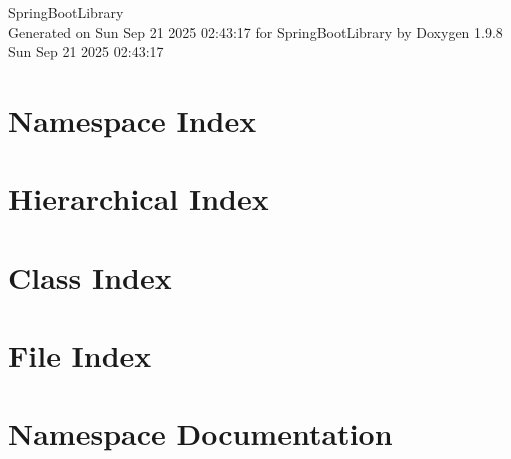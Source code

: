 \documentclass[twoside]{book}
\newcommand{\+}{\discretionary{\mbox{\scriptsize$\hookleftarrow$}}{}{}}
\newcommand{\clearemptydoublepage}{%
    \newpage{\pagestyle{empty}\cleardoublepage}%
  }
\begin{document}
  \raggedbottom
    \hypersetup{pageanchor=false,
                bookmarksnumbered=true,
                pdfencoding=unicode
               }
  \begin{titlepage}
  \vspace*{7cm}
  \begin{center}%
  {\Large Spring\+Boot\+Library}\\
  \vspace*{1cm}
  {\large Generated on Sun Sep 21 2025 02\+:43\+:17 for Spring\+Boot\+Library by Doxygen 1.9.8}\\
    \vspace*{0.5cm}
    {\small Sun Sep 21 2025 02:43:17}
  \end{center}
  \end{titlepage}
  \clearemptydoublepage
  \tableofcontents
  \clearemptydoublepage
  \hypersetup{pageanchor=true}

\chapter{Namespace Index}

\chapter{Hierarchical Index}

\chapter{Class Index}

\chapter{File Index}

\chapter{Namespace Documentation}









\end{document}
